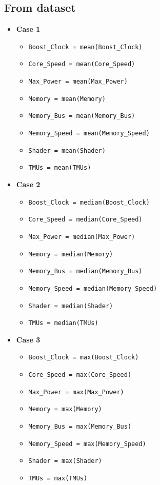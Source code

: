 \documentclass[a4paper]{article}
\begin{document}
\subsection{From dataset}
\begin{itemize}
    \item \textbf{Case 1}
    \begin{itemize}
        \item \verb|Boost_Clock = mean(Boost_Clock)| 
        \item \verb|Core_Speed = mean(Core_Speed)|
        \item \verb|Max_Power = mean(Max_Power)|
        \item \verb|Memory = mean(Memory)|
        \item \verb|Memory_Bus = mean(Memory_Bus)|
        \item \verb|Memory_Speed = mean(Memory_Speed)|
        \item \verb|Shader = mean(Shader)|
        \item \verb|TMUs = mean(TMUs)|
    \end{itemize}
    
    \item \textbf{Case 2}
    \begin{itemize}
        \item \verb|Boost_Clock = median(Boost_Clock)| 
        \item \verb|Core_Speed = median(Core_Speed)|
        \item \verb|Max_Power = median(Max_Power)|
        \item \verb|Memory = median(Memory)|
        \item \verb|Memory_Bus = median(Memory_Bus)|
        \item \verb|Memory_Speed = median(Memory_Speed)|
        \item \verb|Shader = median(Shader)|
        \item \verb|TMUs = median(TMUs)|
    \end{itemize}
    
    \item \textbf{Case 3}
    \begin{itemize}
        \item \verb|Boost_Clock = max(Boost_Clock)| 
        \item \verb|Core_Speed = max(Core_Speed)|
        \item \verb|Max_Power = max(Max_Power)|
        \item \verb|Memory = max(Memory)|
        \item \verb|Memory_Bus = max(Memory_Bus)|
        \item \verb|Memory_Speed = max(Memory_Speed)|
        \item \verb|Shader = max(Shader)|
        \item \verb|TMUs = max(TMUs)|
    \end{itemize}
\end{itemize}
\end{document}
